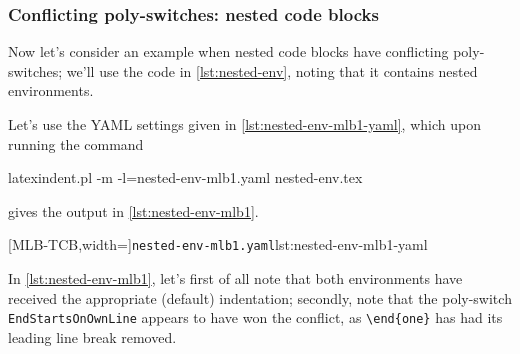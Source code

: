 \subsubsection{Conflicting poly-switches: nested code blocks}
 \begin{example}
 Now let's consider an example when nested code blocks have conflicting poly-switches;
 we'll use the code in \cref{lst:nested-env}, noting that it contains nested
 environments. 


 Let's use the YAML settings given in \cref{lst:nested-env-mlb1-yaml}, which upon running
 the command  

 \begin{commandshell}
latexindent.pl -m -l=nested-env-mlb1.yaml nested-env.tex
\end{commandshell}

 gives the output in \cref{lst:nested-env-mlb1}.

 \begin{cmhtcbraster}[raster column skip=.05\linewidth]
  [MLB-TCB,width=\linewidth]{\texttt{nested-env-mlb1.yaml}}{lst:nested-env-mlb1-yaml}
 \end{cmhtcbraster}

 In \cref{lst:nested-env-mlb1}, let's first of all note that both environments have
 received the appropriate (default) indentation; secondly, note that the poly-switch
 \texttt{EndStartsOnOwnLine} appears to have won the conflict, as \lstinline!\end{one}!
 has had its leading line break removed.
 \end{example}

